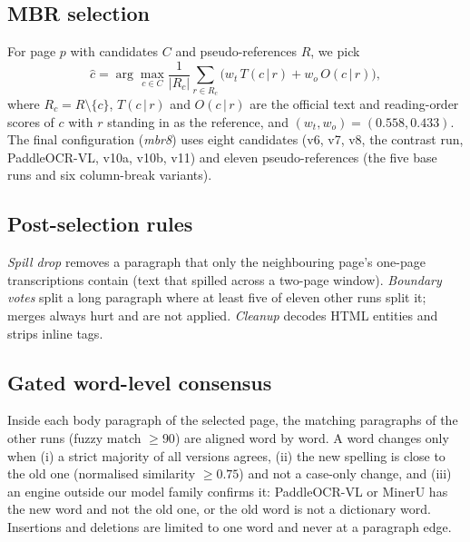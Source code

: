 \documentclass[11pt]{article}
\begin{document}
\subsection{MBR selection}
For page $p$ with candidates $C$ and pseudo-references $R$, we pick
\begin{equation*}
\hat{c} = \arg\max_{c\in C} \frac{1}{|R_c|}\sum_{r\in R_c} \big(w_t\,T(c\,|\,r) + w_o\,O(c\,|\,r)\big),
\end{equation*}
where $R_c = R\setminus\{c\}$, $T(c\,|\,r)$ and $O(c\,|\,r)$ are the official text and reading-order scores of $c$ with $r$ standing in as the reference, and $(w_t,w_o)=(0.558,0.433)$. The final configuration (\emph{mbr8}) uses eight candidates (v6, v7, v8, the contrast run, PaddleOCR-VL, v10a, v10b, v11) and eleven pseudo-references (the five base runs and six column-break variants).

\subsection{Post-selection rules}
\emph{Spill drop} removes a paragraph that only the neighbouring page's one-page transcriptions contain (text that spilled across a two-page window). \emph{Boundary votes} split a long paragraph where at least five of eleven other runs split it; merges always hurt and are not applied. \emph{Cleanup} decodes HTML entities and strips inline tags.

\subsection{Gated word-level consensus}
Inside each body paragraph of the selected page, the matching paragraphs of the other runs (fuzzy match $\geq 90$) are aligned word by word. A word changes only when (i) a strict majority of all versions agrees, (ii) the new spelling is close to the old one (normalised similarity $\geq 0.75$) and not a case-only change, and (iii) an engine outside our model family confirms it: PaddleOCR-VL or MinerU has the new word and not the old one, or the old word is not a dictionary word. Insertions and deletions are limited to one word and never at a paragraph edge.
\end{document}

